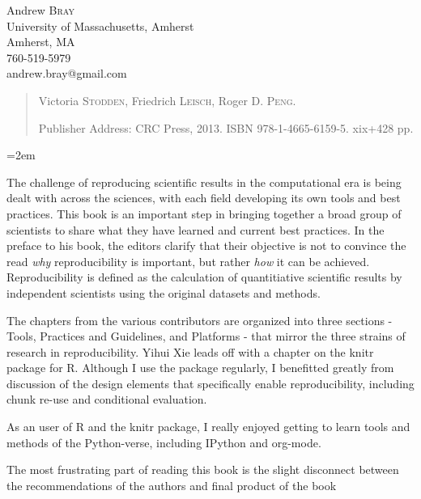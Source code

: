 \documentclass[12pt]{article}
\begin{document}
\noindent
Andrew \textsc{Bray}\\
University of Massachusetts, Amherst \\
Amherst, MA \\
760-519-5979 \\
andrew.bray@gmail.com\\
\medskip

\begin{quote}
Victoria \textsc{Stodden},
Friedrich \textsc{Leisch},
Roger D. \textsc{Peng}.

Publisher Address: CRC Press, 2013. ISBN 978-1-4665-6159-5. 
xix+428 pp. 
\end{quote}

\thispagestyle{empty}
\raggedright\baselineskip=18pt\parindent=2em\parskip=5pt

The challenge of reproducing scientific results in the computational era is 
being dealt with across the sciences, with each field developing its own
 tools and best practices.  This book is an important step in bringing together
 a broad group of scientists to share what they have learned and current best
practices.  In the preface to his book, the editors clarify that their objective
is not to convince the read \emph{why} reproducibility is important, but rather
\emph{how} it can be achieved. Reproducibility is defined as the calculation of
quantitiative scientific results by independent scientists using the original
datasets and methods.

The chapters from the various contributors are organized into three sections -
 Tools, Practices and Guidelines, and Platforms - that mirror the three strains 
of research in reproducibility. Yihui Xie leads off with a chapter on the knitr
package for R.  Although I use the package regularly, I benefitted greatly from
discussion of the design elements that specifically enable reproducibility,
including chunk re-use and conditional evaluation.

As an user of R and the knitr package, I really enjoyed getting to learn 
tools and methods of the Python-verse, including IPython and org-mode.

The most frustrating part of reading this book is the slight disconnect between
the recommendations of the authors and final product of the book
\end{document}

